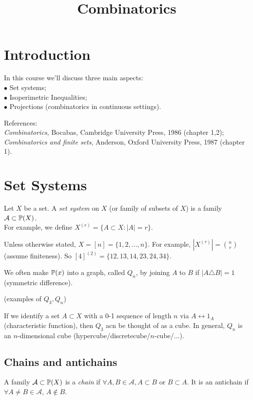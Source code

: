 \documentclass[a4paper]{article}
\begin{document}
\title{Combinatorics}

\maketitle

\newpage

\tableofcontents

\newpage

\section{Introduction}

In this course we'll discuss three main aspects:\\
$\bullet$ Set systems;\\
$\bullet$ Isoperimetric Inequalities;\\
$\bullet$ Projections (combinatorics in continuous settings).

References:\\
\emph{Combinatorics}, Bocabas, Cambridge University Press, 1986 (chapter 1,2);\\
\emph{Combinatorics and finite sets}, Anderson, Oxford University Press, 1987 (chapter 1).

\newpage

\section{Set Systems}

Let $X$ be a set. A \emph{set system} on $X$ (or family of subsets of $X$) is a family $\mathcal{A} \subset \P(X)$.\\
For example, we define $X^{(r)} = \{A \subset X: |A| = r\}$.

Unless otherwise stated, $X=[n] = \{1,2,...,n\}$. For example, $|X^{(r)}| = {n \choose r}$ (assume finiteness). So $[4]^{(2)} = \{12,13,14,23,24,34\}$.

We often make $\P(x)$ into a graph, called $Q_n$, by joining $A$ to $B$ if $|A \triangle B| = 1$ (symmetric difference).

(examples of $Q_3,Q_n$)

If we identify a set $A \subset X$ with a 0-1 sequence of length $n$ via $A \leftrightarrow 1_A$ (characteristic function), then $Q_3$ acn be thought of as a cube. In general, $Q_n$ is an $n$-dimensional cube (hypercube/discretecube/$n$-cube/...).

\subsection{Chains and antichains}
A family $\mathcal{A} \subset \P(X)$ is a \emph{chain} if $\forall A,B \in \mathcal{A}, A \subset B$ or $B \subset A$. It is an antichain if $\forall A \neq B \in \mathcal{A}$, $A \not\in B$.
\end{document}
